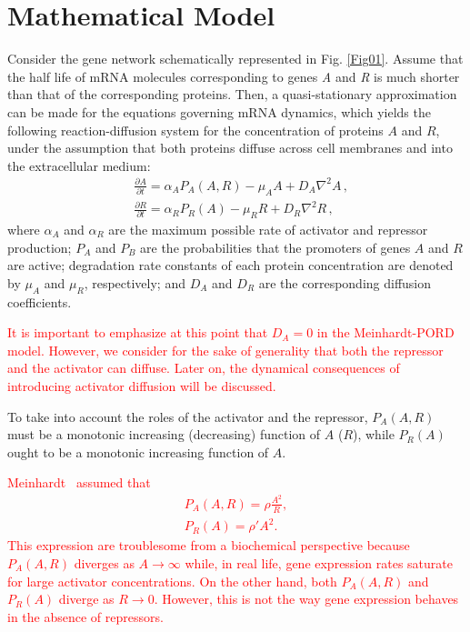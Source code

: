 \documentclass[%
 preprint,
 aip, 
 amsmath,amssymb,
]{revtex4-2}
\begin{document}
	\section{Mathematical Model}
	\label{model}
	
Consider the gene network schematically represented in Fig. \ref{Fig01}. Assume that the half life of mRNA molecules corresponding to genes \textit{A} and \textit{R} is much shorter than that of the corresponding proteins. Then, a quasi-stationary approximation can be made for the equations governing mRNA dynamics, which yields the following reaction-diffusion system for the concentration of proteins $A$ and $R$, under the assumption that both proteins diffuse across cell membranes and into the extracellular medium:
	\begin{subequations}\label{eq012}
		\begin{flalign}
		& \frac{\partial A}{\partial t} = \alpha_A P_A (A, R) - \mu_A A + D_A \nabla^2 A\,,
		\label{eq01} \\
		& \frac{\partial R}{\partial t} = \alpha_R P_R (A) - \mu_R R + D_R \nabla^2 R\,,
		\label{eq02}
		\end{flalign}
	\end{subequations}
where $\alpha_A$ and $\alpha_R$ are the maximum possible rate of activator and repressor production; $P_A$ and $P_B$ are the probabilities that the promoters of genes $A$ and $R$ are active; degradation rate constants of each protein concentration are denoted by $\mu_A$ and $\mu_R$, respectively; and $D_A$ and $D_R$ are the corresponding diffusion coefficients.

\textcolor{red}{It is important to emphasize at this point that $D_A = 0$ in the Meinhardt-PORD model. However, we consider for the sake of generality that both the repressor and the activator can diffuse. Later on, the dynamical consequences of introducing activator diffusion will be discussed.}
	
To take into account the roles of the activator and the repressor, $P_A(A, R)$ must be a monotonic increasing (decreasing) function of $A$ ($R$), while $P_R(A)$ ought to be a monotonic increasing function of $A$. 

\textcolor{red}{Meinhardt~\cite{Meinhardt1982} assumed that
	\begin{subequations}\label{eq034a}
		\begin{gather}
		P_A(A, R) = \displaystyle \rho \frac{A^2}{R}, \label{eq03a} \\[3mm]
		P_R(A) = \rho' A^2. \label{eq04a}
		\end{gather}
	\end{subequations}
This expression are troublesome from a biochemical perspective because $P_A(A, R)$ diverges as $A \to \infty$ while, in real life, gene expression rates saturate for large activator concentrations. On the other hand, both $P_A(A, R)$ and $P_R(A)$ diverge as $R \to 0$. However, this is not the way gene expression behaves in the absence of repressors.} 
\end{document}
